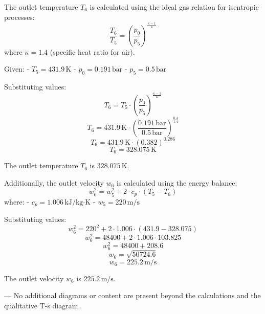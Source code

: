 The outlet temperature \( T_6 \) is calculated using the ideal gas relation for isentropic processes:  
\[
\frac{T_6}{T_5} = \left( \frac{p_0}{p_5} \right)^{\frac{\kappa - 1}{\kappa}}
\]  
where \( \kappa = 1.4 \) (specific heat ratio for air).  

Given:  
- \( T_5 = 431.9 \, \text{K} \)  
- \( p_0 = 0.191 \, \text{bar} \)  
- \( p_5 = 0.5 \, \text{bar} \)  

Substituting values:  
\[
T_6 = T_5 \cdot \left( \frac{p_0}{p_5} \right)^{\frac{\kappa - 1}{\kappa}}
\]  
\[
T_6 = 431.9 \, \text{K} \cdot \left( \frac{0.191 \, \text{bar}}{0.5 \, \text{bar}} \right)^{\frac{0.4}{1.4}}
\]  
\[
T_6 = 431.9 \, \text{K} \cdot \left( 0.382 \right)^{0.286}
\]  
\[
T_6 = 328.075 \, \text{K}
\]  

The outlet temperature \( T_6 \) is \( 328.075 \, \text{K} \).  

Additionally, the outlet velocity \( w_6 \) is calculated using the energy balance:  
\[
w_6^2 = w_5^2 + 2 \cdot c_p \cdot (T_5 - T_6)
\]  
where:  
- \( c_p = 1.006 \, \text{kJ}/\text{kg·K} \)  
- \( w_5 = 220 \, \text{m/s} \)  

Substituting values:  
\[
w_6^2 = 220^2 + 2 \cdot 1.006 \cdot (431.9 - 328.075)
\]  
\[
w_6^2 = 48400 + 2 \cdot 1.006 \cdot 103.825
\]  
\[
w_6^2 = 48400 + 208.6
\]  
\[
w_6 = \sqrt{50724.6}
\]  
\[
w_6 = 225.2 \, \text{m/s}
\]  

The outlet velocity \( w_6 \) is \( 225.2 \, \text{m/s} \).  

---  
No additional diagrams or content are present beyond the calculations and the qualitative T-s diagram.